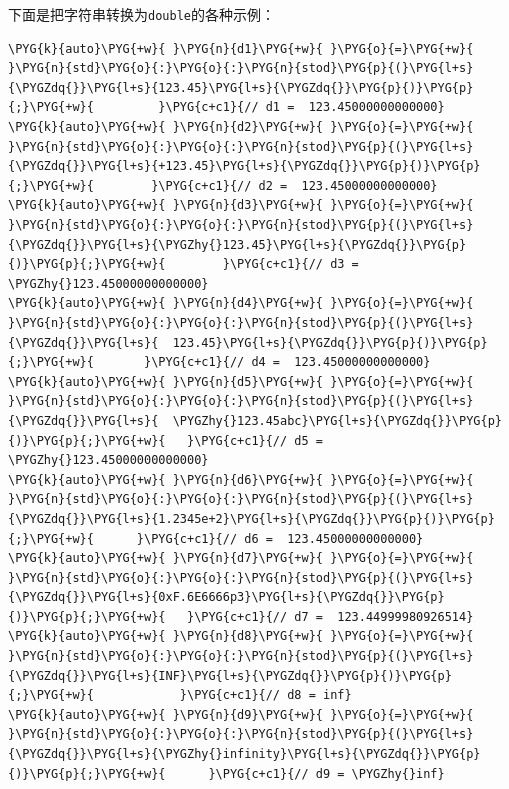 
下面是把字符串转换为\texttt{double}的各种示例：



\begin{codeblockbg}
\begin{Verbatim}[commandchars=\\\{\},breaklines=true,breakanywhere=true,fontsize=\codefont,xleftmargin=17bp]
\PYG{k}{auto}\PYG{+w}{ }\PYG{n}{d1}\PYG{+w}{ }\PYG{o}{=}\PYG{+w}{ }\PYG{n}{std}\PYG{o}{:}\PYG{o}{:}\PYG{n}{stod}\PYG{p}{(}\PYG{l+s}{\PYGZdq{}}\PYG{l+s}{123.45}\PYG{l+s}{\PYGZdq{}}\PYG{p}{)}\PYG{p}{;}\PYG{+w}{         }\PYG{c+c1}{// d1 =  123.45000000000000}
\PYG{k}{auto}\PYG{+w}{ }\PYG{n}{d2}\PYG{+w}{ }\PYG{o}{=}\PYG{+w}{ }\PYG{n}{std}\PYG{o}{:}\PYG{o}{:}\PYG{n}{stod}\PYG{p}{(}\PYG{l+s}{\PYGZdq{}}\PYG{l+s}{+123.45}\PYG{l+s}{\PYGZdq{}}\PYG{p}{)}\PYG{p}{;}\PYG{+w}{        }\PYG{c+c1}{// d2 =  123.45000000000000}
\PYG{k}{auto}\PYG{+w}{ }\PYG{n}{d3}\PYG{+w}{ }\PYG{o}{=}\PYG{+w}{ }\PYG{n}{std}\PYG{o}{:}\PYG{o}{:}\PYG{n}{stod}\PYG{p}{(}\PYG{l+s}{\PYGZdq{}}\PYG{l+s}{\PYGZhy{}123.45}\PYG{l+s}{\PYGZdq{}}\PYG{p}{)}\PYG{p}{;}\PYG{+w}{        }\PYG{c+c1}{// d3 = \PYGZhy{}123.45000000000000}
\PYG{k}{auto}\PYG{+w}{ }\PYG{n}{d4}\PYG{+w}{ }\PYG{o}{=}\PYG{+w}{ }\PYG{n}{std}\PYG{o}{:}\PYG{o}{:}\PYG{n}{stod}\PYG{p}{(}\PYG{l+s}{\PYGZdq{}}\PYG{l+s}{  123.45}\PYG{l+s}{\PYGZdq{}}\PYG{p}{)}\PYG{p}{;}\PYG{+w}{       }\PYG{c+c1}{// d4 =  123.45000000000000}
\PYG{k}{auto}\PYG{+w}{ }\PYG{n}{d5}\PYG{+w}{ }\PYG{o}{=}\PYG{+w}{ }\PYG{n}{std}\PYG{o}{:}\PYG{o}{:}\PYG{n}{stod}\PYG{p}{(}\PYG{l+s}{\PYGZdq{}}\PYG{l+s}{  \PYGZhy{}123.45abc}\PYG{l+s}{\PYGZdq{}}\PYG{p}{)}\PYG{p}{;}\PYG{+w}{   }\PYG{c+c1}{// d5 = \PYGZhy{}123.45000000000000}
\PYG{k}{auto}\PYG{+w}{ }\PYG{n}{d6}\PYG{+w}{ }\PYG{o}{=}\PYG{+w}{ }\PYG{n}{std}\PYG{o}{:}\PYG{o}{:}\PYG{n}{stod}\PYG{p}{(}\PYG{l+s}{\PYGZdq{}}\PYG{l+s}{1.2345e+2}\PYG{l+s}{\PYGZdq{}}\PYG{p}{)}\PYG{p}{;}\PYG{+w}{      }\PYG{c+c1}{// d6 =  123.45000000000000}
\PYG{k}{auto}\PYG{+w}{ }\PYG{n}{d7}\PYG{+w}{ }\PYG{o}{=}\PYG{+w}{ }\PYG{n}{std}\PYG{o}{:}\PYG{o}{:}\PYG{n}{stod}\PYG{p}{(}\PYG{l+s}{\PYGZdq{}}\PYG{l+s}{0xF.6E6666p3}\PYG{l+s}{\PYGZdq{}}\PYG{p}{)}\PYG{p}{;}\PYG{+w}{   }\PYG{c+c1}{// d7 =  123.44999980926514}
\PYG{k}{auto}\PYG{+w}{ }\PYG{n}{d8}\PYG{+w}{ }\PYG{o}{=}\PYG{+w}{ }\PYG{n}{std}\PYG{o}{:}\PYG{o}{:}\PYG{n}{stod}\PYG{p}{(}\PYG{l+s}{\PYGZdq{}}\PYG{l+s}{INF}\PYG{l+s}{\PYGZdq{}}\PYG{p}{)}\PYG{p}{;}\PYG{+w}{            }\PYG{c+c1}{// d8 = inf}
\PYG{k}{auto}\PYG{+w}{ }\PYG{n}{d9}\PYG{+w}{ }\PYG{o}{=}\PYG{+w}{ }\PYG{n}{std}\PYG{o}{:}\PYG{o}{:}\PYG{n}{stod}\PYG{p}{(}\PYG{l+s}{\PYGZdq{}}\PYG{l+s}{\PYGZhy{}infinity}\PYG{l+s}{\PYGZdq{}}\PYG{p}{)}\PYG{p}{;}\PYG{+w}{      }\PYG{c+c1}{// d9 = \PYGZhy{}inf}

\end{Verbatim}
\end{codeblockbg}
